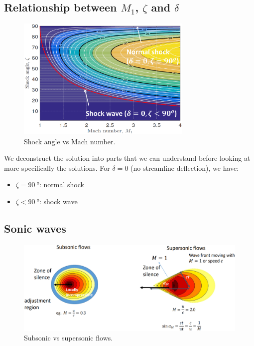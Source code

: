 \subsection{Relationship between $M_1$, $\zeta$ and $\delta$}
\begin{figure}[H]
    \centering
    \includegraphics[width = 0.75\textwidth]{./img/diagram12.png}
    \caption{Shock angle vs Mach number.}
\end{figure}
We deconstruct the solution into parts that we can understand before looking at more specifically the solutions. For $\delta = 0$ (no streamline deflection), we have:
\begin{itemize}[noitemsep]
    \item $\zeta = \SI{90}{\degree}$: normal shock
    \item $\zeta < \SI{90}{\degree}$: shock wave
\end{itemize}
\subsection{Sonic waves}
\begin{figure}[H]
    \centering
    \includegraphics[width = \textwidth]{./img/diagram13.png}
    \caption{Subsonic vs supersonic flows.}
\end{figure}
